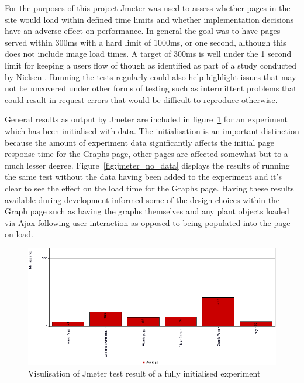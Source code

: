 For the purposes of this project Jmeter was used to assess whether pages in the site would load within defined time limits and whether implementation decisions have an adverse effect on performance. In general the goal was to have pages served within 300ms with a hard limit of 1000ms, or one second, although this does not include image load times. A target of 300ms is well under the 1 second limit for keeping a users flow of though as identified as part of a study conducted by Nielsen \cite{responseTimes}. Running the tests regularly could also help highlight issues that may not be uncovered under other forms of testing such as intermittent problems that could result in request errors that would be difficult to reproduce otherwise.


General results as output by Jmeter are included in figure~\ref{fig:jmeter_with_data} for an experiment which has been initialised with data. The initialisation is an important distinction because the amount of experiment data significantly affects the initial page response time for the Graphs page, other pages are affected somewhat but to a much lesser degree. Figure~\ref{fig:jmeter_no_data} displays the results of running the same test without the data having been added to the experiment and it's clear to see the effect on the load time for the Graphs page. Having these results available during development informed some of the design choices within the Graph page such as having the graphs themselves and any plant objects loaded via Ajax following user interaction as opposed to being populated into the page on load.
\begin{figure}[H]
    \centering
    \includegraphics[width=\textwidth]{images/testing/jmeter_final_crop}
    \caption{Visulisation of Jmeter test result of a fully initialised experiment}
    \label{fig:jmeter_with_data}
\end{figure} 


